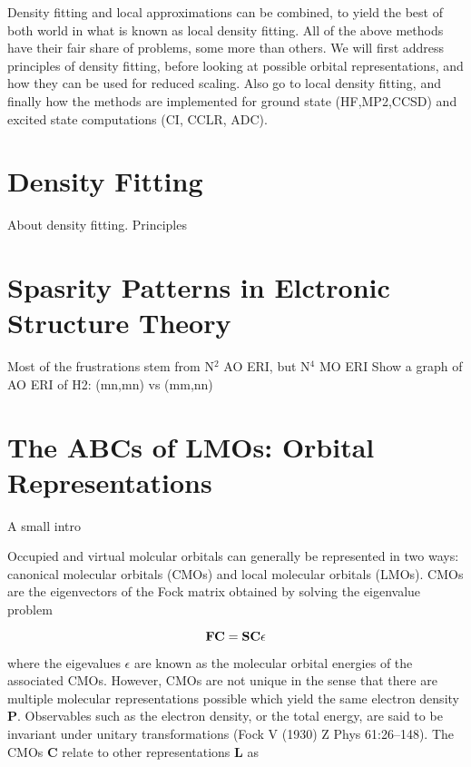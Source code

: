 Density fitting and local approximations can be combined, to yield the best of both world in what is known as local density fitting.
All of the above methods have their fair share of problems, some more than others. We will first address principles of density fitting, before looking at possible orbital representations, and how they can be used for reduced scaling. Also go to local density fitting, and finally how the methods are implemented for ground state (HF,MP2,CCSD) and excited state computations (CI, CCLR, ADC).

\section{Density Fitting}
About density fitting. Principles

\section{Spasrity Patterns in Elctronic Structure Theory}

Most of the frustrations stem from N$^2$ AO ERI, but N$^4$ MO ERI
Show a graph of AO ERI of H2: (mn,mn) vs (mm,nn)

\section{The ABCs of LMOs: Orbital Representations}

A small intro


Occupied and virtual molcular orbitals can generally be represented in two ways: canonical molecular orbitals (CMOs) and local molecular orbitals (LMOs). CMOs are the eigenvectors of the Fock matrix obtained by solving the eigenvalue problem

\begin{equation}
\mathbf{F}\mathbf{C} = \mathbf{S}\mathbf{C} \epsilon
\end{equation}

where the eigevalues $\epsilon$ are known as the molecular orbital energies of the associated CMOs. However, CMOs are not unique in the sense that there are multiple molecular representations possible which yield the same electron density $\mathbf{P}$. Observables such as the electron density, or the total energy, are said to be invariant under unitary transformations (Fock V (1930) Z Phys 61:26–148). The CMOs $\mathbf{C}$ relate to other representations $\mathbf{L}$ as

